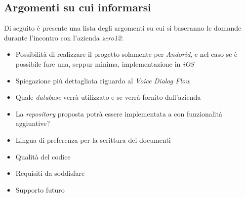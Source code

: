 \documentclass[a4paper,12pt]{article}
\begin{document}
	\subsection{Argomenti su cui informarsi}
	Di seguito è presente una lista degli argomenti su cui si baseranno le domande durante l'incontro con l'azienda \textit{zero12}:
	\begin{itemize}
		\item Possibilità di realizzare il progetto solamente per \textit{Andorid}, e nel caso se è possibile fare una, seppur minima, implementazione in \textit{iOS}
		\item Spiegazione più dettagliata riguardo al \textit{Voice Dialog Flow}
		\item Quale \textit{database} verrà utilizzato e se verrà fornito dall'azienda
		\item La \textit{repository} proposta potrà essere implementata a con funzionalità aggiuntive?
		\item Lingua di preferenza per la scrittura dei documenti
		\item Qualità del codice
		\item Requisiti da soddisfare
		\item Supporto futuro 
	\end{itemize}
	
	\label{LastPage}
\end{document}
